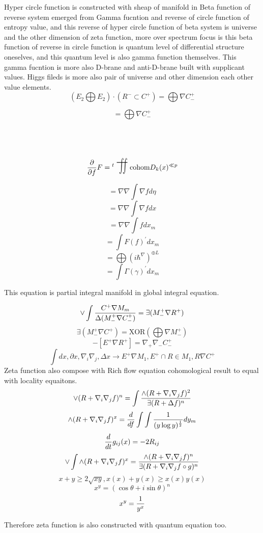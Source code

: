 \documentclass{jsarticle}
\begin{document}
    Hyper circle function is constructed with sheap of manifold in 
    Beta function of reverse system emerged from Gamma fucntion 
    and reverse of circle function of entropy value,
    and this reverse of hyper circle function of beta system
    is universe and the other dimension of zeta function,
    more over spectrum focus is this beta function of reverse in
    circle function is quantum level of differential structure oneselves,
    and this quantum level is also gamma function themselves.
    This gamma fucntion is more also D-brane and anti-D-brane built 
    with supplicant values. Higgs fileds is more also pair of universe and
    other dimension each other value elements. 
$$ (E_2 \bigoplus E_2) \cdot (R^{-} \subset C^{+})  = 
\bigoplus \nabla C^{+}_{-} $$

$$ = \bigoplus \nabla C^{+}_{-} $$


 $$ {\partial \over \partial f}F = {{}^t \scalebox{1}[2]{\variint}} \text{cohom}D_k(x)^{\ll p} $$

 $$ = \nabla \nabla \int \nabla f d\eta $$
 $$ = \nabla \nabla \int \nabla f dx $$
 $$ = \nabla \nabla \int f dx_m $$
 $$ = \int F(f)^{'}dx_m $$
 $$ = \bigoplus{(i \hbar^{\nabla})}^{\oplus L}$$
 $$ = \int \Gamma(\gamma)^{'}dx_m $$

 This equation is partial integral manifold in global integral equation.
 
$$ \vee \int {C^{+} \nabla M_m \over {\Delta(M^{+}_{-} \nabla C^{+}_{-})}} = \exists(M^{+}_{-} \nabla R^{+}) $$
$$ \exists(M^{+}_{-} \nabla C^{+}) = \mathrm{XOR}(\bigoplus \nabla M^{+}_{-}) $$
$$ -[E^{+} \nabla R^{+}] = \nabla_{+} \nabla_{-} C^{+}_{-}$$ $$ \int dx, \partial x, \nabla_i \nabla_j , \Delta x \to
 E^{+} \nabla M_1, E^{+} \cap R \in M_1, R \nabla C^{+} $$
 Zeta function also compose with Rich flow equation cohomological result to equal with locality equaitons.
$$ \vee(R + \nabla_i \nabla_j f)^n = \int {\wedge(R + \nabla_i \nabla_j f)^2 \over \exists(R + \Delta f)^n} $$
$$ \wedge(R + \nabla_i \nabla_j f)^x = {d \over df}\int \int {1 \over (y \log y)^{1 \over 2}}dy_m $$
$$ {d \over dt}g_{ij}(x) = - 2 R_{ij} $$
$$ \vee \int  \wedge(R + \nabla_i \nabla_j f)^x = {\wedge(R + \nabla_i \nabla_j f)^n \over 
\exists(R + \nabla_i \nabla_j f \circ g)^n}$$
$$ x + y \ge 2\sqrt{xy}, x(x) + y(x) \ge x(x)y(x) $$
$$ x^y = (\cos \theta + i \sin \theta)^n $$
$$ x^y = {1 \over y^x} $$

 Therefore zeta function is also constructed with quantum equation too.
\end{document}
